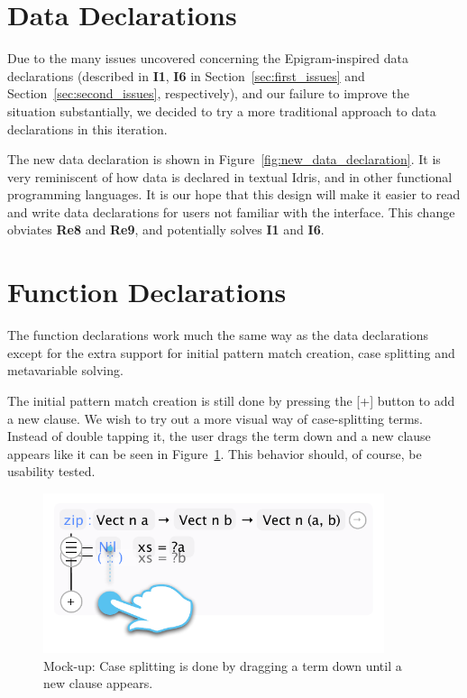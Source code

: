 \section{Data Declarations}
\label{subsec:new_design_data_dec}
Due to the many issues uncovered concerning the Epigram-inspired data declarations (described in \textbf{I1}, \textbf{I6} in Section~\ref{sec:first_issues} and Section~\ref{sec:second_issues}, respectively), and our failure to improve the situation substantially, we decided to try a more traditional approach to data declarations
in this iteration.

The new data declaration is shown in Figure~\ref{fig:new_data_declaration}.
It is very reminiscent of how data is declared in textual Idris, and in other functional programming languages.
It is our hope that this design will make it easier to read and write data declarations for users not familiar with the interface. This change obviates \textbf{Re8} and \textbf{Re9}, and potentially solves \textbf{I1} and \textbf{I6}.

\section{Function Declarations}
\label{subsec:new_design_function_dec}
The function declarations work much the same way as the data declarations
except for the extra support for initial pattern match creation, case splitting
and metavariable solving.

The initial pattern match creation is still done by pressing the [+] button to
add a new clause. We wish to try out a more visual way of case-splitting terms. Instead of double tapping it, the user drags the term
down and a new clause appears like it can be seen in Figure~\ref{fig:case_splitting}.
This behavior should, of course, be usability tested.

\begin{figure}
	\centering
		\includegraphics[width=100mm]{diagrams/design_case_splitting.pdf}
	\caption{Mock-up: Case splitting is done by dragging a term down until a new clause
	appears.}
\label{fig:case_splitting}
\end{figure}

